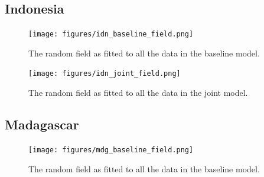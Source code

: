 \documentclass[10pt,a4]{article}
\begin{document}
\clearpage
\subsection{Indonesia}




\begin{figure}[h!]
\centering

\texttt{[image: figures/idn\_baseline\_field.png]}

\caption{The random field as fitted to all the data in the baseline model.}
\label{baselinefieldidn}
\end{figure}



\begin{figure}[h!]
     \centering
     \label{gpsencov}
\end{figure}

\begin{figure}[h!]
\centering

\texttt{[image: figures/idn\_joint\_field.png]}

\caption{The random field as fitted to all the data in the joint model.}
\label{jointfieldidn}
\end{figure}



\clearpage
\subsection{Madagascar}





\begin{figure}[h!]
\centering

\texttt{[image: figures/mdg\_baseline\_field.png]}

\caption{The random field as fitted to all the data in the baseline model.}
\label{baselinefieldmdg}
\end{figure}




\begin{figure}[h!]
     \centering
     \label{gpsencov}
\end{figure}
\end{document}
